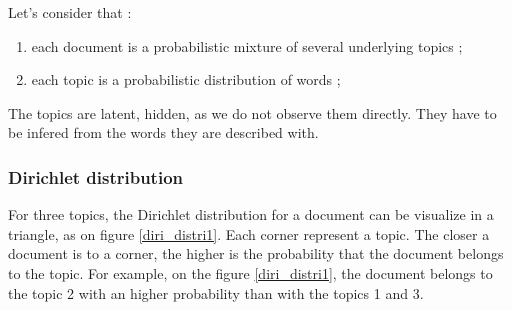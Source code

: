 \documentclass[a4paper,12pt]{report}
\begin{document}
Let's consider that : 
\begin{enumerate}
\item each document is a probabilistic mixture of several underlying topics ;
\item each topic is a probabilistic distribution of words ;
\end{enumerate}

The topics are latent, hidden, as we do not observe them directly. They have to be infered from the words they are described with.

\subsubsection{Dirichlet distribution}
For three topics, the Dirichlet distribution for a document can be visualize in a triangle, as on figure \ref{diri_distri1}. Each corner represent a topic. The closer a document is to a corner, the higher is the probability that the document belongs to the topic. For example, on the figure \ref{diri_distri1}, the document belongs to the topic 2 with an higher probability than with the topics 1 and 3.
\end{document}
